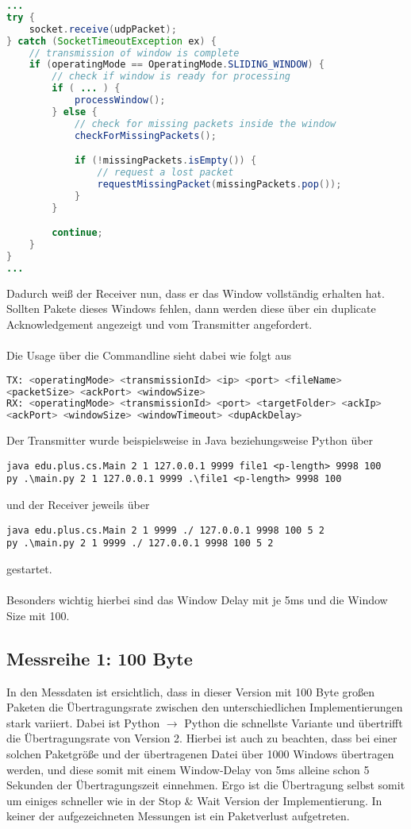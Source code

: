 \documentclass{article}
\begin{document}
    \begin{lstlisting}[language=Java]
...
try {
    socket.receive(udpPacket);
} catch (SocketTimeoutException ex) {
    // transmission of window is complete
    if (operatingMode == OperatingMode.SLIDING_WINDOW) {
        // check if window is ready for processing
        if ( ... ) {
            processWindow();
        } else {
            // check for missing packets inside the window
            checkForMissingPackets();

            if (!missingPackets.isEmpty()) {
                // request a lost packet
                requestMissingPacket(missingPackets.pop());
            }
        }

        continue;
    }
}
...
    \end{lstlisting}
    Dadurch weiß der Receiver nun, dass er das Window vollständig erhalten hat.
    Sollten Pakete dieses Windows fehlen, dann werden diese über ein duplicate Acknowledgement angezeigt und
    vom Transmitter angefordert.\\ \\
    Die Usage über die Commandline sieht dabei wie folgt aus
    \begin{lstlisting}[language=Bash]
TX: <operatingMode> <transmissionId> <ip> <port> <fileName>
<packetSize> <ackPort> <windowSize>
RX: <operatingMode> <transmissionId> <port> <targetFolder> <ackIp>
<ackPort> <windowSize> <windowTimeout> <dupAckDelay>
    \end{lstlisting}
    Der Transmitter wurde beispielsweise in Java beziehungsweise Python über
    \begin{lstlisting}
java edu.plus.cs.Main 2 1 127.0.0.1 9999 file1 <p-length> 9998 100
py .\main.py 2 1 127.0.0.1 9999 .\file1 <p-length> 9998 100
    \end{lstlisting}und der Receiver jeweils über
    \begin{lstlisting}
java edu.plus.cs.Main 2 1 9999 ./ 127.0.0.1 9998 100 5 2
py .\main.py 2 1 9999 ./ 127.0.0.1 9998 100 5 2
    \end{lstlisting}
    gestartet.\\ \\
    Besonders wichtig hierbei sind das Window Delay mit je 5ms und die Window Size mit 100.

    \subsection{Messreihe 1: 100 Byte}
    In den Messdaten ist ersichtlich, dass in dieser Version mit 100 Byte großen Paketen die Übertragungsrate zwischen
    den unterschiedlichen Implementierungen stark variiert.
    Dabei ist Python $\rightarrow$ Python die schnellste Variante und übertrifft die Übertragungsrate von Version 2.
    Hierbei ist auch zu beachten, dass bei einer solchen Paketgröße und der übertragenen Datei über 1000 Windows
    übertragen werden, und diese somit mit einem Window-Delay von 5ms alleine schon 5 Sekunden der Übertragungszeit
    einnehmen.
    Ergo ist die Übertragung selbst somit um einiges schneller wie in der Stop \& Wait Version der Implementierung.
    In keiner der aufgezeichneten Messungen ist ein Paketverlust aufgetreten.
\end{document}
